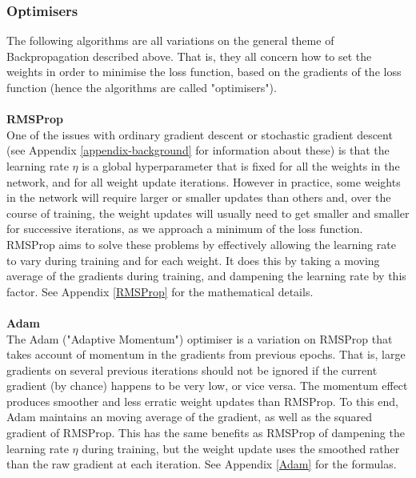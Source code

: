 \documentclass[11pt]{article} %
\theoremstyle{plain}
\theoremstyle{definition}
\begin{document}
\subsubsection{Optimisers}
The following algorithms are all variations on the general theme of Backpropagation described above. That is, they all concern how to set the weights in order to minimise the loss function, based on the gradients of the loss function (hence the algorithms are called "optimisers"). 
\\
\\
\noindent
\textbf{RMSProp}
\\
\noindent
One of the issues with ordinary gradient descent or stochastic gradient descent (see Appendix \ref{appendix-background} for information about these) is that the learning rate \(\eta\) is a global hyperparameter that is fixed for all the weights in the network, and for all weight update iterations. However in practice, some weights in the network will require larger or smaller updates than others and, over the course of training, the weight updates will usually need to get smaller and smaller for successive iterations, as we approach a minimum of the loss function. RMSProp aims to solve these problems by effectively allowing the learning rate to vary during training and for each weight. It does this by taking a moving average of the gradients during training, and dampening the learning rate by this factor. See Appendix \ref{RMSProp} for the mathematical details.
\\
\\
\noindent
\textbf{Adam}
\\
\noindent
The Adam ("Adaptive Momentum") optimiser is a variation on RMSProp that takes account of momentum in the gradients from previous epochs. That is, large gradients on several previous iterations should not be ignored if the current gradient (by chance) happens to be very low, or vice versa. The momentum effect produces smoother and less erratic weight updates than RMSProp. To this end, Adam maintains an moving average of the gradient, as well as the squared gradient of RMSProp. This has the same benefits as RMSProp of dampening the learning rate \(\eta\) during training, but the weight update uses the smoothed rather than the raw gradient at each iteration. See Appendix \ref{Adam} for the formulas.
\end{document}
